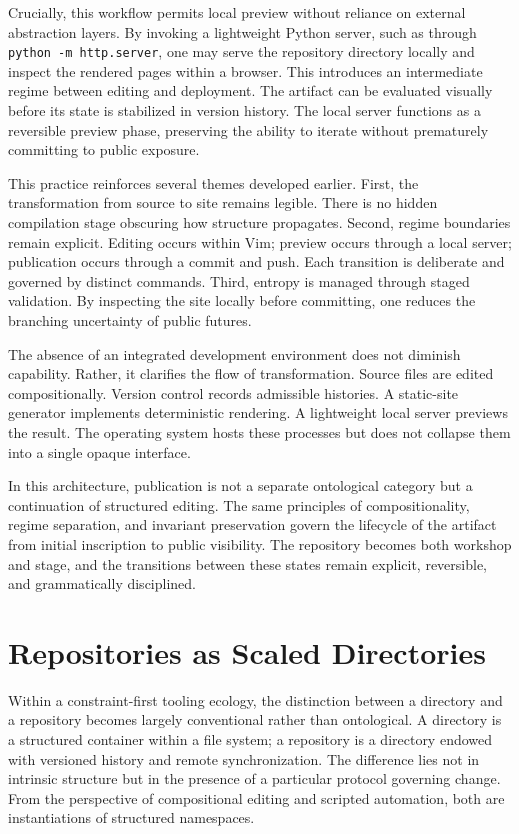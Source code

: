 \documentclass[12pt]{article}
\begin{document}
Crucially, this workflow permits local preview without reliance on external abstraction layers. By invoking a lightweight Python server, such as through \texttt{python -m http.server}, one may serve the repository directory locally and inspect the rendered pages within a browser. This introduces an intermediate regime between editing and deployment. The artifact can be evaluated visually before its state is stabilized in version history. The local server functions as a reversible preview phase, preserving the ability to iterate without prematurely committing to public exposure.

This practice reinforces several themes developed earlier. First, the transformation from source to site remains legible. There is no hidden compilation stage obscuring how structure propagates. Second, regime boundaries remain explicit. Editing occurs within Vim; preview occurs through a local server; publication occurs through a commit and push. Each transition is deliberate and governed by distinct commands. Third, entropy is managed through staged validation. By inspecting the site locally before committing, one reduces the branching uncertainty of public futures.

The absence of an integrated development environment does not diminish capability. Rather, it clarifies the flow of transformation. Source files are edited compositionally. Version control records admissible histories. A static-site generator implements deterministic rendering. A lightweight local server previews the result. The operating system hosts these processes but does not collapse them into a single opaque interface.

In this architecture, publication is not a separate ontological category but a continuation of structured editing. The same principles of compositionality, regime separation, and invariant preservation govern the lifecycle of the artifact from initial inscription to public visibility. The repository becomes both workshop and stage, and the transitions between these states remain explicit, reversible, and grammatically disciplined.

\section{Repositories as Scaled Directories}

Within a constraint-first tooling ecology, the distinction between a directory and a repository becomes largely conventional rather than ontological. A directory is a structured container within a file system; a repository is a directory endowed with versioned history and remote synchronization. The difference lies not in intrinsic structure but in the presence of a particular protocol governing change. From the perspective of compositional editing and scripted automation, both are instantiations of structured namespaces.
\end{document}
